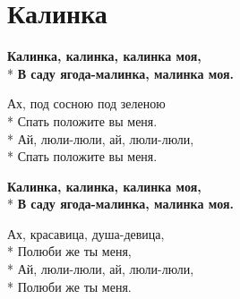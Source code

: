 \vspace{\fill}\newpage

\section{Калинка}
\label{song:Калинка}

\medskip

\begin{minipage}{\linewidth}
\hspace*{1.5em}\textbf{Калинка, калинка, калинка моя,}\\*
\hspace*{1.5em}\textbf{В саду ягода-малинка, малинка моя.}\\
\end{minipage}\par\medskip\nobreak

\medskip

\begin{minipage}{\linewidth}
Ах, под сосною под зеленою\\*
Спать положите вы меня.\\*
Ай, люли-люли, ай, люли-люли,\\*
Спать положите вы меня.\\
\end{minipage}\par\medskip\nobreak

\medskip

\begin{minipage}{\linewidth}
\hspace*{1.5em}\textbf{Калинка, калинка, калинка моя,}\\*
\hspace*{1.5em}\textbf{В саду ягода-малинка, малинка моя.}\\
\end{minipage}\par\medskip\nobreak

\medskip

\begin{minipage}{\linewidth}
Ах, красавица, душа-девица,\\*
Полюби же ты меня,\\*
Ай, люли-люли, ай, люли-люли,\\*
Полюби же ты меня.\\
\end{minipage}\par\medskip\nobreak

